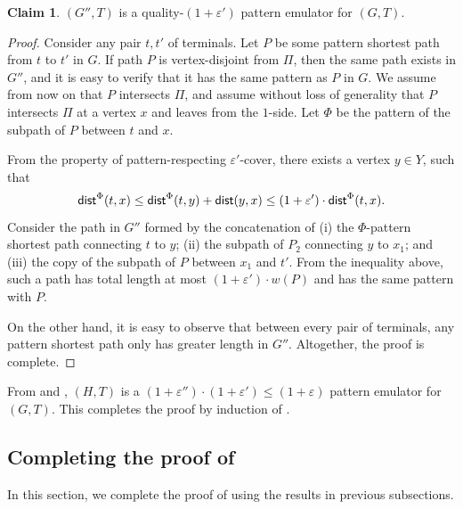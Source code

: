 \documentclass[11pt]{article}
\theoremstyle{definition}
\newtheorem{claim}[theorem]{Claim}
\newcommand{\eps}{{\varepsilon}}
\newcommand{\dist}{\textnormal{\textsf{dist}}}
\begin{document}
\begin{claim}
	\label{clm: cut glue}
	$(G'',T)$ is a quality-$(1+\eps')$ pattern emulator for $(G,T)$.
\end{claim}
\begin{proof}
Consider any pair $t,t'$ of terminals. 
Let $P$ be some pattern shortest path from $t$ to $t'$ in $G$. If path $P$ is vertex-disjoint from $\Pi$, then the same path exists in $G''$, and it is easy to verify that it has the same pattern as $P$ in $G$. We assume from now on that $P$ intersects $\Pi$, and assume without loss of generality that $P$ intersects $\Pi$ at a vertex $x$ and leaves from the $1$-side.
Let $\Phi$ be the pattern of the subpath of $P$ between $t$ and $x$.
	
From the property of pattern-respecting $\eps'$-cover, there exists a vertex $y\in Y$, such that 
$$\dist^{\Phi}(t,x)\le \dist^{\Phi}(t,y)+\dist(y,x)\le (1+\eps')\cdot \dist^{\Phi}(t,x).$$ 
Consider the path in $G''$ formed by the concatenation of (i) the $\Phi$-pattern shortest path connecting $t$ to $y$; (ii) the subpath of $P_2$ connecting $y$ to $x_1$; and (iii) the copy of the subpath of $P$ between $x_1$ and $t'$.
From the inequality above, such a path has total length at most $(1+\eps')\cdot w(P)$ and has the same pattern with $P$.

On the other hand, it is easy to observe that between every pair of terminals, any pattern shortest path only has greater length in $G''$. Altogether, the proof is complete.	
\end{proof}



From  and , $(H,T)$ is a $(1+\eps'')\cdot (1+\eps')\le (1+\eps)$ pattern emulator for $(G,T)$. This completes the proof by induction of .




\subsection{Completing the proof of }

In this section, we complete the proof of  using the results in previous subsections.
\end{document}
